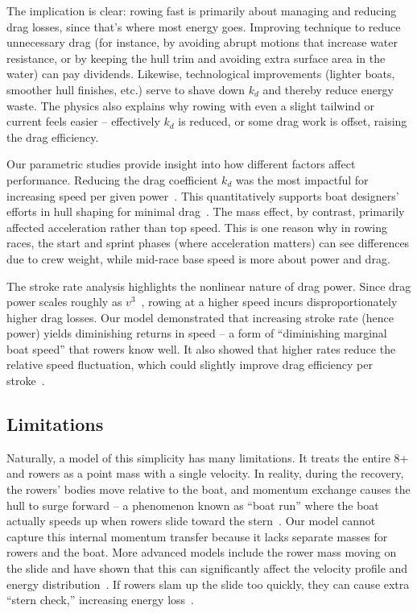 \documentclass[12pt]{article}
\begin{document}
The implication is clear: rowing fast is primarily about managing and reducing drag losses, since that’s where most energy goes. Improving technique to reduce unnecessary drag (for instance, by avoiding abrupt motions that increase water resistance, or by keeping the hull trim and avoiding extra surface area in the water) can pay dividends. Likewise, technological improvements (lighter boats, smoother hull finishes, etc.) serve to shave down $k_d$ and thereby reduce energy waste. The physics also explains why rowing with even a slight tailwind or current feels easier – effectively $k_d$ is reduced, or some drag work is offset, raising the drag efficiency.

Our parametric studies provide insight into how different factors affect performance. Reducing the drag coefficient $k_d$ was the most impactful for increasing speed per given power~\cite{lazauskas1997}. This quantitatively supports boat designers’ efforts in hull shaping for minimal drag~\cite{tucklazauskas1996}. The mass effect, by contrast, primarily affected acceleration rather than top speed. This is one reason why in rowing races, the start and sprint phases (where acceleration matters) can see differences due to crew weight, while mid-race base speed is more about power and drag.

The stroke rate analysis highlights the nonlinear nature of drag power. Since drag power scales roughly as \texorpdfstring{$v^3$}{v^3}~\cite{tucklazauskas1996}, rowing at a higher speed incurs disproportionately higher drag losses. Our model demonstrated that increasing stroke rate (hence power) yields diminishing returns in speed – a form of “diminishing marginal boat speed” that rowers know well. It also showed that higher rates reduce the relative speed fluctuation, which could slightly improve drag efficiency per stroke~\cite{sandersonmartindale1986}. 


\subsection{Limitations}

Naturally, a model of this simplicity has many limitations. It treats the entire 8+ and rowers as a point mass with a single velocity. In reality, during the recovery, the rowers’ bodies move relative to the boat, and momentum exchange causes the hull to surge forward – a phenomenon known as “boat run” where the boat actually speeds up when rowers slide toward the stern~\cite{dudhia2000, pulman2007}. Our model cannot capture this internal momentum transfer because it lacks separate masses for rowers and the boat. More advanced models include the rower mass moving on the slide and have shown that this can significantly affect the velocity profile and energy distribution~\cite{vanholst2004, mola2014}. If rowers slam up the slide too quickly, they can cause extra “stern check,” increasing energy loss~\cite{smithloschner2002}.
\end{document}
